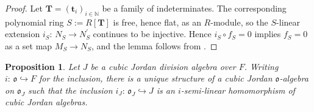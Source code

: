 \documentclass{amsart}
\newtheorem{prop}[equation]{Proposition}
\theoremstyle{definition} %
\theoremstyle{remark} %
\newcommand{\bft}{\mathbf{t}}
\newcommand{\IN}{\mathbb{N}}
\newcommand{\bfT}{\mathbf{T}}
\newcommand{\mfo}{\mathfrak{o}}
\renewcommand{\:}{\colon\,}
\numberwithin{equation}{section}
\begin{document}
\begin{proof}
Let $\bfT = (\bft_i)_{i \in \IN}$ be a family of indeterminates. The corresponding polynomial ring $S := R[\bfT]$ is free, hence flat, as an $R$-module, so the $S$-linear extension $i_S\:N_S \to N^\prime_S$ continues to be injective. Hence $i_S \circ f_S = 0$ implies $f_S = 0$ as a set map $M_S \to N_S$, and the lemma follows from \cite[Cor.~12.11]{MR4806163}.	
\end{proof}

\begin{prop} \label{p.JAYOJA}
Let $J$ be a cubic Jordan division algebra over $F$. Writing $i\:\mfo \hookrightarrow F$ for the inclusion, there is a unique structure  of a cubic Jordan $\mfo$-algebra on $\mfo_J$ such that the inclusion $i_J\:\mfo_J \hookrightarrow J$ is an $i$-semi-linear homomorphism of cubic Jordan algebras.
\end{prop}
\end{document}
